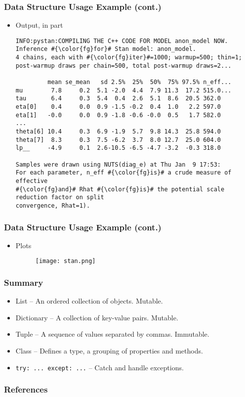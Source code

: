 \documentclass{beamer}
\begin{document}
\begin{frame}[fragile]
\frametitle{Data Structure Usage Example (cont.)}
\begin{itemize}
\item Output, in part
\begin{lstlisting}[escapechar=\#]
INFO:pystan:COMPILING THE C++ CODE FOR MODEL anon_model NOW.
Inference #{\color{fg}for}# Stan model: anon_model.
4 chains, each with #{\color{fg}iter}#=1000; warmup=500; thin=1; 
post-warmup draws per chain=500, total post-warmup draws=2...

         mean se_mean   sd 2.5%  25%  50%  75% 97.5% n_eff...
mu        7.8     0.2  5.1 -2.0  4.4  7.9 11.3  17.2 515.0...
tau       6.4     0.3  5.4  0.4  2.6  5.1  8.6  20.5 362.0 
eta[0]    0.4     0.0  0.9 -1.5 -0.2  0.4  1.0   2.2 597.0 
eta[1]   -0.0     0.0  0.9 -1.8 -0.6 -0.0  0.5   1.7 582.0 
...
theta[6] 10.4     0.3  6.9 -1.9  5.7  9.8 14.3  25.8 594.0 
theta[7]  8.3     0.3  7.5 -6.2  3.7  8.0 12.7  25.0 604.0 
lp__     -4.9     0.1  2.6-10.5 -6.5 -4.7 -3.2  -0.3 318.0 

Samples were drawn using NUTS(diag_e) at Thu Jan  9 17:53:
For each parameter, n_eff #{\color{fg}is}# a crude measure of effective 
#{\color{fg}and}# Rhat #{\color{fg}is}# the potential scale reduction factor on split 
convergence, Rhat=1).
\end{lstlisting}
\end{itemize}
\end{frame}

\begin{frame}[fragile]
\frametitle{Data Structure Usage Example (cont.)}
\begin{itemize}
\item Plots
\begin{figure}[h]
  \texttt{[image: stan.png]}
\end{figure}
\end{itemize}
\end{frame}

\begin{frame}[fragile]
\frametitle{Summary}
\begin{itemize}
\item List -- An ordered collection of objects. Mutable.
\item Dictionary -- A collection of key-value pairs. Mutable.
\item Tuple -- A sequence of values separated by commas. Immutable.
\item Class -- Defines a type, a grouping of properties and methods.
\item \lstinline{try: ... except: ...} -- Catch and handle exceptions.
\end{itemize}
\end{frame}

\begin{frame}%
  \frametitle{References}
  
  \scriptsize
  
\end{frame}
\end{document}
